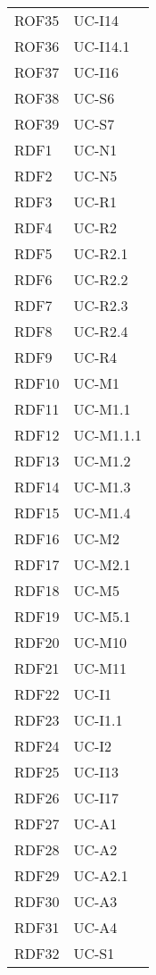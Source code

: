 \begin{longtable}{| p{5cm} | p{5cm} |}
		\rowcolor{LightGray}
		ROF35 & UC-I14\\
		ROF36 & UC-I14.1\\
		\rowcolor{LightGray}
		ROF37 & UC-I16\\
		ROF38 & UC-S6\\
		\rowcolor{LightGray}
		ROF39 & UC-S7\\		
		RDF1 & UC-N1\\
		\rowcolor{LightGray}
		RDF2 & UC-N5\\
		RDF3 & UC-R1 \\
		\rowcolor{LightGray}
		RDF4 & UC-R2\\
		RDF5 & UC-R2.1\\
		\rowcolor{LightGray}
		RDF6 & UC-R2.2\\
		RDF7 & UC-R2.3\\
		\rowcolor{LightGray}
		RDF8 & UC-R2.4\\
		RDF9 & UC-R4\\
		\rowcolor{LightGray}
		RDF10 & UC-M1\\
		RDF11 & UC-M1.1 \\
		\rowcolor{LightGray}
		RDF12 & UC-M1.1.1 \\
		RDF13 & UC-M1.2 \\
		\rowcolor{LightGray}
		RDF14 & UC-M1.3 \\
		RDF15 & UC-M1.4 \\
		\rowcolor{LightGray}
		RDF16 & UC-M2 \\
		RDF17 & UC-M2.1 \\
		\rowcolor{LightGray}
		RDF18 & UC-M5 \\
		RDF19 & UC-M5.1 \\
		\rowcolor{LightGray}	
		RDF20 & UC-M10\\
		RDF21 & UC-M11\\
		\rowcolor{LightGray}
		RDF22 & UC-I1\\
		RDF23 & UC-I1.1\\
		\rowcolor{LightGray}
		RDF24 & UC-I2 \\
		RDF25 & UC-I13 \\
		\rowcolor{LightGray}
		RDF26 & UC-I17\\
		RDF27 & UC-A1\\
		\rowcolor{LightGray}
		RDF28 & UC-A2\\
		RDF29 & UC-A2.1\\
		\rowcolor{LightGray}
		RDF30 & UC-A3\\
		RDF31 & UC-A4\\
		\rowcolor{LightGray}
		RDF32 & UC-S1\\

\end{longtable}
